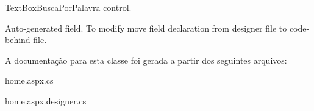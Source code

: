 TextBoxBuscaPorPalavra control. 

Auto-\/generated field. To modify move field declaration from designer file to code-\/behind file. 

A documentação para esta classe foi gerada a partir dos seguintes arquivos:\begin{DoxyCompactItemize}
\item 
home.aspx.cs\item 
home.aspx.designer.cs\end{DoxyCompactItemize}
